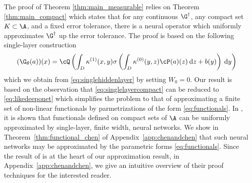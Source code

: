 The proof of Theorem \ref{thm:main_measurable} relies on Theorem \ref{thm:main_compact} which states that for any continuous \(\G^\dagger\), any compact set \(K \subset \A\), and a fixed error tolerance, there is a neural operator which uniformly approximates \(\G^\dagger\) up the error tolerance. The proof is based on the following single-layer construction 
\begin{equation}
    \label{eq:singlelayercompact}
    (\G_\theta (a))(x) = \cQ \left( \int_D \kappa^{(1)} (x,y) \sigma \left ( \int_D \kappa^{(0)} (y,z) \cP (a)(z) \: \text{d}z + b(y) \right ) \: \text{d}y \right ) 
\end{equation}
which we obtain from \eqref{eq:singlehiddenlayer} by setting \(W_0 = 0\). Our result is based on the observation that \eqref{eq:singlelayercompact} can be reduced to \eqref{eq:likedeeponet} which simplifies the problem to that of approximating a finite set of non-linear functionals by parmetrizations of the form \eqref{eq:functionals}. In \cite{chen1995universal}, it is shown that functionals defined on compact sets of \(\A\) can be uniformly approximated by single-layer, finite width, neural networks. We show in Theorem~\ref{thm:functional_chen} of Appendix~\ref{app:chenandchen} that such neural networks may be approximated by the parametric forms \eqref{eq:functionals}. Since the result of \cite{chen1995universal} is at the heart of our approximation result, in Appendix~\ref{app:chenandchen}, we give an intuitive overview of their proof techniques for the interested reader. 

